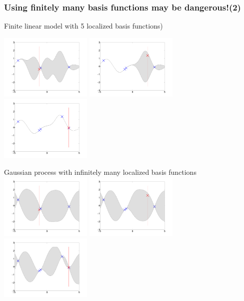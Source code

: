 \begin{frame}
\frametitle{\!\!\!Using finitely many basis functions may be dangerous!(2)}

Finite linear model with 5 localized basis functions)

\includegraphics[width=0.33\textwidth]{seq_linear_M4.pdf}
\includegraphics[width=0.33\textwidth]{seq_linear_M5.pdf}
\includegraphics[width=0.33\textwidth]{seq_linear_M6.pdf}

Gaussian process with infinitely many localized basis functions
\includegraphics[width=0.33\textwidth]{seq_fullGP_M4.pdf}
\includegraphics[width=0.33\textwidth]{seq_fullGP_M5.pdf}
\includegraphics[width=0.33\textwidth]{seq_fullGP_M6.pdf}
\end{frame}


